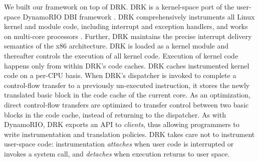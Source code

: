 \documentclass[10pt,preprint]{sigplanconf}
\begin{document}

We built our framework on top of DRK. DRK is a kernel-space port of the user-space DynamoRIO DBI framework \cite{Bruening2004}. DRK comprehensively instruments all Linux kernel and module code, including interrupt and exception handlers, and works on multi-core processors \cite{Feiner2012}. Further, DRK maintains the precise interrupt delivery semantics of the x86 architecture. DRK is loaded as a kernel module and thereafter controls the execution of all kernel code. Execution of kernel code happens only from within DRK's code caches. DRK caches instrumented kernel code on a per-CPU basis. When DRK's dispatcher is invoked to complete a control-flow transfer to a previously un-executed instruction, it stores the newly translated basic block in the code cache of the current core. As an optimization, direct control-flow transfers are optimized to transfer control between two basic blocks in the code cache, instead of returning to the dispatcher. As with DynamoRIO, DRK exports an API to \emph{clients}, thus allowing programmers to write instrumentation and translation policies. DRK takes care not to instrument user-space code: instrumentation \emph{attaches} when user code is interrupted or invokes a system call, and \emph{detaches} when execution returns to user space.




\end{document}
